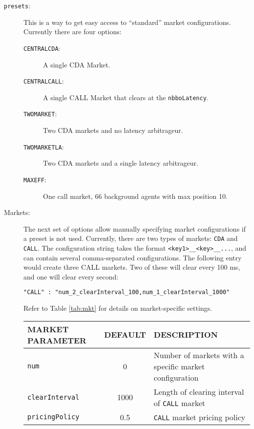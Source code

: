 \documentclass[11pt]{article}
\begin{document}
\begin{description}

\item[\texttt{presets}:] This is a way to get easy access to ``standard'' market
  configurations. Currently there are four options:
  \begin{description}
  \item[\texttt{CENTRALCDA}:] A single CDA Market.
  \item[\texttt{CENTRALCALL}:] A single CALL Market that clears at the \texttt{nbboLatency}.
  \item[\texttt{TWOMARKET}:] Two CDA markets and no latency arbitrageur.
  \item[\texttt{TWOMARKETLA}:] Two CDA markets and a single latency arbitrageur.
  \item[\texttt{MAXEFF}:] One call market, 66 background agents with max position 10.
  \end{description}
  
\item[Markets:] The next set of options allow manually specifying market configurations
  if a preset is not used. Currently, there are two types of markets: \texttt{CDA} and \texttt{CALL}. The configuration string takes the format
  \texttt{<key1>\_<value1>\_<key>\_<value2>\_...}, and can contain several comma-separated configurations. The following entry would create three CALL
  markets. Two of these will clear every 100 ms, and one will clear every
  second:

\begin{verbatim}
"CALL" : "num_2_clearInterval_100,num_1_clearInterval_1000"
\end{verbatim}

Refer to Table \ref{tab:mkt} for details on market-specific settings.

\begin{table}
\centering
\begin{tabular}[f]{p{} c p{}}
\uppercase{Market parameter}   & \uppercase{Default} & \uppercase{Description} \\ \hline

\texttt{num}			& 0	& Number of markets with a specific market configuration \\

\texttt{clearInterval} 		& 1000 & Length of clearing interval of \texttt{CALL} market \\
\texttt{pricingPolicy}			& 0.5 & \texttt{CALL} market pricing policy


\end{tabular}
\end{table}
\end{description}
\end{document}
